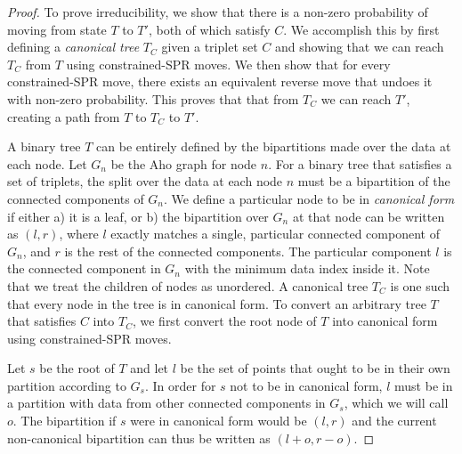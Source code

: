 \irreducible*
\begin{proof}
To prove irreducibility, we show that there is a non-zero probability
of moving from state $T$ to $T'$, both of which satisfy $C$. We
accomplish this by first defining a \emph{canonical tree} $T_C$ given a triplet 
set $C$ and showing that we can reach $T_C$ from $T$ using  
constrained-SPR moves. We then show that for every constrained-SPR move,
there exists an equivalent reverse move that undoes it with non-zero
probability.
This proves that that from $T_C$ we can reach $T'$, 
creating a path from $T$ to $T_C$ to $T'$.

A binary tree $T$ can be entirely defined by the bipartitions
made over the data at each node. 
Let $G_n$ be the Aho graph for node $n$.
For a binary tree that satisfies a set of triplets, 
the split over the data at each node $n$ must 
be a bipartition of the connected components of $G_n$.
We define a particular node to be in \emph{canonical form}
if either a) it is a leaf, or b) the bipartition over $G_n$
at that node can be written as
$(l, r)$, where $l$ exactly matches a single, particular connected component of
$G_n$, and $r$ is the rest of the connected components. 
The particular component
$l$ is the connected component in $G_n$ with the minimum data index
inside it.
Note that we treat the children of nodes as unordered.
A canonical tree $T_C$ is one such that every node in the tree is
in canonical form.
To convert an arbitrary tree $T$ that satisfies $C$ into $T_C$, we first
convert the root node of $T$ into canonical form
using constrained-SPR moves.

Let $s$ be the root of $T$ and let $l$
be the set of points that ought to be in their own partition according
to $G_s$. In order for
$s$ not to be in canonical form, $l$ must be in a partition with 
data from other connected components in $G_s$, which we will call $o$.
The bipartition if $s$ were in canonical form would be $(l, r)$ and
the current non-canonical bipartition can thus be written as $(l + o, r - o)$.


\end{proof}
